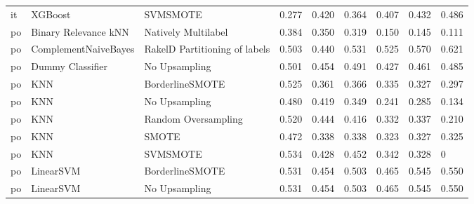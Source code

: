 \begin{tabular}{lllllllll}
      it &                         XGBoost &                      SVMSMOTE & 0.277 &                     0.420 &                 0.364 &                  0.407 &                                   0.432 &     0.486 \\
      po &            Binary Relevance kNN &           Natively Multilabel & 0.384 &                     0.350 &                 0.319 &                  0.150 &                                   0.145 &     0.111 \\
      po &            ComplementNaiveBayes & RakelD Partitioning of labels & 0.503 &                     0.440 &                 0.531 &                  0.525 &                                   0.570 &     0.621 \\
      po &                Dummy Classifier &                 No Upsampling & 0.501 &                     0.454 &                 0.491 &                  0.427 &                                   0.461 &     0.485 \\
      po &                             KNN &               BorderlineSMOTE & 0.525 &                     0.361 &                 0.366 &                  0.335 &                                   0.327 &     0.297 \\
      po &                             KNN &                 No Upsampling & 0.480 &                     0.419 &                 0.349 &                  0.241 &                                   0.285 &     0.134 \\
      po &                             KNN &           Random Oversampling & 0.520 &                     0.444 &                 0.416 &                  0.332 &                                   0.337 &     0.210 \\
      po &                             KNN &                         SMOTE & 0.472 &                     0.338 &                 0.338 &                  0.323 &                                   0.327 &     0.325 \\
      po &                             KNN &                      SVMSMOTE & 0.534 &                     0.428 &                 0.452 &                  0.342 &                                   0.328 &         0 \\
      po &                       LinearSVM &               BorderlineSMOTE & 0.531 &                     0.454 &                 0.503 &                  0.465 &                                   0.545 &     0.550 \\
      po &                       LinearSVM &                 No Upsampling & 0.531 &                     0.454 &                 0.503 &                  0.465 &                                   0.545 &     0.550 \\

\end{tabular}

